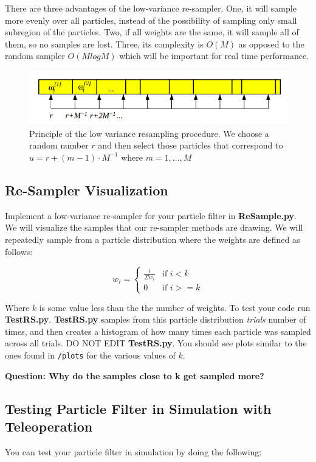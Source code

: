 \documentclass[final]{article}
\begin{document}
There are three advantages of the low-variance re-sampler. One, it will sample more evenly over all particles, instead of the possibility of sampling only small subregion of the particles. Two, if all weights are the same, it will sample all of them, so no samples are lost. Three, its complexity is \(O(M)\) as opposed to the random sampler \(O(MlogM)\) which will be important for real time performance.

\begin{figure}
    \centering
    \includegraphics[width=0.8\linewidth]{figs/resample.png}
    \caption{Principle of the low variance resampling procedure. We choose a random number \(r\) and then select those particles that correspond to \(u = r + (m - 1) \cdot M^{-1}\) where \(m = 1, . . . , M\)}
    \label{fig:resample}
\end{figure}

\subsection{Re-Sampler Visualization}
Implement a low-variance re-sampler for your particle filter in \textbf{ReSample.py}. We will visualize the samples that our re-sampler methods are drawing. We will repeatedly sample from a particle distribution where the weights are defined as follows:

\[
	w_i = 
	\begin{cases}
	\frac{i}{\Sigma w_i} & \text{if } i < k\\
	0 & \text{if } i >= k
	\end{cases}
\]

Where $k$ is some value less than the the number of weights. To test your code run \textbf{TestRS.py}. \textbf{TestRS.py} samples from this particle distribution \textit{trials} number of times, and then creates a histogram of how many times each particle was sampled across all trials. DO NOT EDIT \textbf{TestRS.py}. You should see plots similar to the ones found in \texttt{/plots} for the various values of \(k\).

\textbf{Question: Why do the samples close to k get sampled more?}

\subsection{Testing Particle Filter in Simulation with Teleoperation}
\label{sec:test_pf_sim_teleop}
You can test your particle filter in simulation by doing the following:
\end{document}
